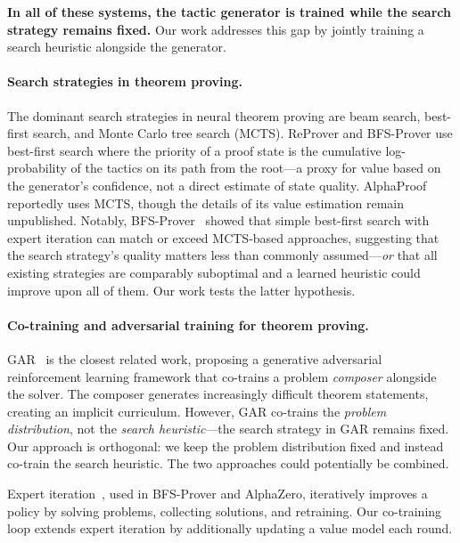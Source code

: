 \documentclass{article}
\begin{document}
\textbf{In all of these systems, the tactic generator is trained while the search strategy remains fixed.} Our work addresses this gap by jointly training a search heuristic alongside the generator.

\paragraph{Search strategies in theorem proving.}
The dominant search strategies in neural theorem proving are beam search, best-first search, and Monte Carlo tree search (MCTS). ReProver and BFS-Prover use best-first search where the priority of a proof state is the cumulative log-probability of the tactics on its path from the root---a proxy for value based on the generator's confidence, not a direct estimate of state quality. AlphaProof~\citep{alphaproof2025} reportedly uses MCTS, though the details of its value estimation remain unpublished. Notably, BFS-Prover~\citep{xin2025bfsprover} showed that simple best-first search with expert iteration can match or exceed MCTS-based approaches, suggesting that the search strategy's quality matters less than commonly assumed---\emph{or} that all existing strategies are comparably suboptimal and a learned heuristic could improve upon all of them. Our work tests the latter hypothesis.

\paragraph{Co-training and adversarial training for theorem proving.}
GAR~\citep{wang2025gar} is the closest related work, proposing a generative adversarial reinforcement learning framework that co-trains a problem \emph{composer} alongside the solver. The composer generates increasingly difficult theorem statements, creating an implicit curriculum. However, GAR co-trains the \emph{problem distribution}, not the \emph{search heuristic}---the search strategy in GAR remains fixed. Our approach is orthogonal: we keep the problem distribution fixed and instead co-train the search heuristic. The two approaches could potentially be combined.

Expert iteration~\citep{anthony2017thinking}, used in BFS-Prover and AlphaZero, iteratively improves a policy by solving problems, collecting solutions, and retraining. Our co-training loop extends expert iteration by additionally updating a value model each round.
\end{document}
